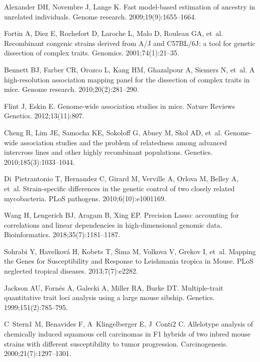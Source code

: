 \documentclass[10pt,letterpaper]{article}
\begin{document}
\begin{thebibliography}{10}
	Alexander DH, Novembre J, Lange K.
	\newblock Fast model-based estimation of ancestry in unrelated individuals.
	\newblock Genome research. 2009;19(9):1655--1664.
	
	Fortin A, Diez E, Rochefort D, Laroche L, Malo D, Rouleau GA, et~al.
	\newblock Recombinant congenic strains derived from A/J and C57BL/6J: a tool
	for genetic dissection of complex traits.
	\newblock Genomics. 2001;74(1):21--35.
	
	Bennett BJ, Farber CR, Orozco L, Kang HM, Ghazalpour A, Siemers N, et~al.
	\newblock A high-resolution association mapping panel for the dissection of
	complex traits in mice.
	\newblock Genome research. 2010;20(2):281--290.
	
	Flint J, Eskin E.
	\newblock Genome-wide association studies in mice.
	\newblock Nature Reviews Genetics. 2012;13(11):807.
	
	Cheng R, Lim JE, Samocha KE, Sokoloff G, Abney M, Skol AD, et~al.
	\newblock Genome-wide association studies and the problem of relatedness among
	advanced intercross lines and other highly recombinant populations.
	\newblock Genetics. 2010;185(3):1033--1044.
	
	Di~Pietrantonio T, Hernandez C, Girard M, Verville A, Orlova M, Belley A,
	et~al.
	\newblock Strain-specific differences in the genetic control of two closely
	related mycobacteria.
	\newblock PLoS pathogens. 2010;6(10):e1001169.
	
	Wang H, Lengerich BJ, Aragam B, Xing EP.
	\newblock Precision Lasso: accounting for correlations and linear dependencies
	in high-dimensional genomic data.
	\newblock Bioinformatics. 2018;35(7):1181--1187.
	
	Sohrabi Y, Havelkov{\'a} H, Kobets T, {\v{S}}{\'\i}ma M, Volkova V, Grekov I,
	et~al.
	\newblock Mapping the Genes for Susceptibility and Response to Leishmania
	tropica in Mouse.
	\newblock PLoS neglected tropical diseases. 2013;7(7):e2282.
	
	Jackson AU, Forn{\'e}s A, Galecki A, Miller RA, Burke DT.
	\newblock Multiple-trait quantitative trait loci analysis using a large mouse
	sibship.
	\newblock Genetics. 1999;151(2):785--795.
	
	C~Stern1 M, Benavides F, A~Klingelberger E, J~Conti2 C.
	\newblock Allelotype analysis of chemically induced squamous cell carcinomas in
	F1 hybrids of two inbred mouse strains with different susceptibility to tumor
	progression.
	\newblock Carcinogenesis. 2000;21(7):1297--1301.
	

\end{thebibliography}
\end{document}
